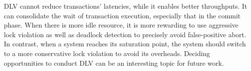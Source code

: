 \documentclass[conference]{IEEEtran}
\begin{document}
\begin{highlighted}

DLV cannot reduce transactions' latencies, while it enables better throughputs.
It can consolidate the wait of transaction execution, especially that in the commit phase.
When there is more idle resource, it is more rewarding to use aggressive lock violation as well as deadlock detection to precisely avoid false-positive abort.
In contrast, when a system reaches its saturation point, the system should switch to a more conservative
lock violation to avoid its overheads.
Deciding opportunities to conduct DLV can be an interesting topic for future work.


\end{highlighted}


\end{document}
